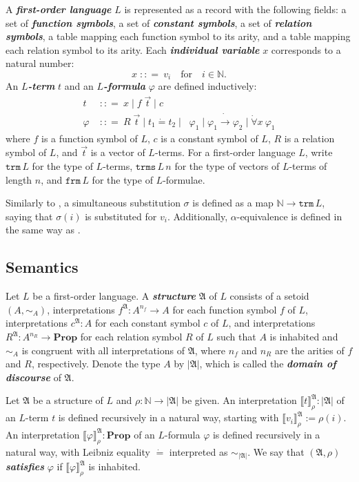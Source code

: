 \documentclass[twocolumn]{article}
\theoremstyle{definition}
\theoremstyle{definition}
\theoremstyle{definition}
\theoremstyle{definition}
\theoremstyle{definition}
\theoremstyle{definition}
\theoremstyle{definition}
\newcommand{\inlinedef}[1]{\emph{\textbf{#1}}}
\newcommand{\IN}{\mathbb{N}}
\newcommand{\0}{\texttt{0}}
\newcommand{\1}{\texttt{1}}
\newcommand{\Prop}{\mathbf{Prop}}
\newcommand{\bnfis}{\mathrel{\;{:}{:}{=}\ }}
\newcommand{\bnfor}{\mathrel{\;\big|\; }}
\newcommand{\Leq}{\mathrel{\dot{=}}}
\newcommand{\Lneg}{\mathop{\dot{\neg}}}
\newcommand{\Lto}{\mathrel{\dot{\to}}}
\newcommand{\Lall}[1]{\dot{\forall}#1\ }
\begin{document}
A \inlinedef{first-order language} $L$ is represented as a record with the following fields:
a set of \inlinedef{function symbols}, a set of \inlinedef{constant symbols}, a set of \inlinedef{relation symbols}, a table mapping each function symbol to its arity, and a table mapping each relation symbol to its arity.
Each \inlinedef{individual variable} $x$ corresponds to a natural number:
\[x \bnfis v_i \quad \mathrm{for} \quad i \in \IN . \]
An \inlinedef{$L$-term} $t$ and an \inlinedef{$L$-formula} $\varphi$ are defined inductively:
\begin{align*}
t &\bnfis x \bnfor f \; \vec{t} \bnfor c  \\
\varphi &\bnfis R \; \vec{t} \bnfor t_1 \Leq t_2 \bnfor \Lneg \varphi_1 \bnfor  \varphi_1  \Lto \varphi_2 \bnfor \Lall{x} \varphi_1
\end{align*}
where $f$ is a function symbol of $L$, $c$ is a constant symbol of $L$, $R$ is a relation symbol of $L$, and $\vec{t}$ is a vector of $L$-terms.
For a first-order language $L$, write $\mathtt{trm} \, L$ for the type of $L$-terms,  $\mathtt{trms} \, L \, n$ for the type of vectors of $L$-terms of length $n$, and $\mathtt{frm} \, L$ for the type of $L$-formulae.

Similarly to \cite{copello2017}, a simultaneous substitution $\sigma$ is defined as a map $\IN \to \mathtt{trm} \, L$, saying that $\sigma (i)$ is substituted for $v_i$. Additionally, $\alpha$-equivalence is defined in the same way as \cite{copello2017}.

\subsection{Semantics}
\label{ss:Semantics}

Let $L$ be a first-order language.
A \inlinedef{structure} $\mathfrak{A}$ of $L$ consists of a setoid $\left( A , \sim_A \right)$,
interpretations $f^\mathfrak{A} : A^{n_f} \to A$ for each function symbol $f$ of $L$,
interpretations $c^\mathfrak{A} : A$ for each constant symbol $c$ of $L$, and
interpretations $R^\mathfrak{A} : A^{n_R} \to \Prop$ for each relation symbol $R$ of $L$
such that $A$ is inhabited and
$\sim_A$ is congruent with all interpretations of $\mathfrak{A}$,
where $n_f$ and $n_R$ are the arities of $f$ and $R$, respectively.
Denote the type $A$ by $| \mathfrak{A} |$, which is called the  \inlinedef{domain of discourse} of $\mathfrak{A}$.

Let $\mathfrak{A}$ be a structure of $L$ and $\rho : \IN \to | \mathfrak{A} |$ be given.
An interpretation $\llbracket t \rrbracket_\rho^\mathfrak{A} : | \mathfrak{A} |$ of an $L$-term $t$ is defined recursively in a natural way, starting with $\llbracket v_i \rrbracket_\rho^\mathfrak{A} := \rho \left( i \right)$.
An interpretation $\llbracket \varphi \rrbracket_\rho^\mathfrak{A} : \Prop$ of an $L$-formula $\varphi$ is defined recursively in a natural way, with Leibniz equality $\Leq$ interpreted as $\sim_{|\mathfrak{A}|}$.
We say that $( \mathfrak{A} , \rho )$ \inlinedef{satisfies} $\varphi$ if $\llbracket \varphi \rrbracket_\rho^\mathfrak{A}$ is inhabited.
\end{document}
